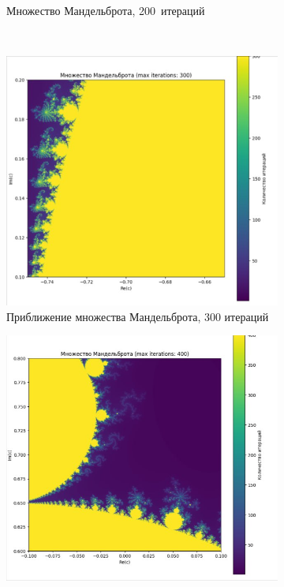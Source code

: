 \begin{figure}[H]
\begin{subfigure}{0.4\textwidth}
        \caption{Множество Мандельброта, 200~итераций}
    \end{subfigure}
    \\
    \begin{subfigure}{0.4\textwidth}
        \includegraphics[width=\textwidth]{plots/M3.jpg}
        \caption{Приближение множества Мандельброта, 300 итераций }
    \end{subfigure}
    \hspace{1.7cm}
    \begin{subfigure}{0.4\textwidth}
        \includegraphics[width=\textwidth]{plots/M4.jpg}

\end{subfigure}
\end{figure}
